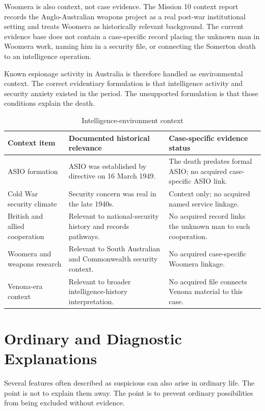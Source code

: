 Woomera is also context, not case evidence. The Mission 10 context report records the Anglo-Australian weapons project as a real post-war institutional setting and treats Woomera as historically relevant background. The current evidence base does not contain a case-specific record placing the unknown man in Woomera work, naming him in a security file, or connecting the Somerton death to an intelligence operation.

Known espionage activity in Australia is therefore handled as environmental context. The correct evidentiary formulation is that intelligence activity and security anxiety existed in the period. The unsupported formulation is that those conditions explain the death.

\begin{table}[htbp]
\centering
\caption{Intelligence-environment context}
\label{tab:context-intelligence-organisations}
\begin{tabularx}{\textwidth}{p{}X p{}}
\toprule
Context item & Documented historical relevance & Case-specific evidence status \\
\midrule
ASIO formation & ASIO was established by directive on 16 March 1949. & The death predates formal ASIO; no acquired case-specific ASIO link. \\
Cold War security climate & Security concern was real in the late 1940s. & Context only; no acquired named service linkage. \\
British and allied cooperation & Relevant to national-security history and records pathways. & No acquired record links the unknown man to such cooperation. \\
Woomera and weapons research & Relevant to South Australian and Commonwealth security context. & No acquired case-specific Woomera linkage. \\
Venona-era context & Relevant to broader intelligence-history interpretation. & No acquired file connects Venona material to this case. \\
\bottomrule
\end{tabularx}
\end{table}

\section{Ordinary and Diagnostic Explanations}

Several features often described as suspicious can also arise in ordinary life. The point is not to explain them away. The point is to prevent ordinary possibilities from being excluded without evidence.

